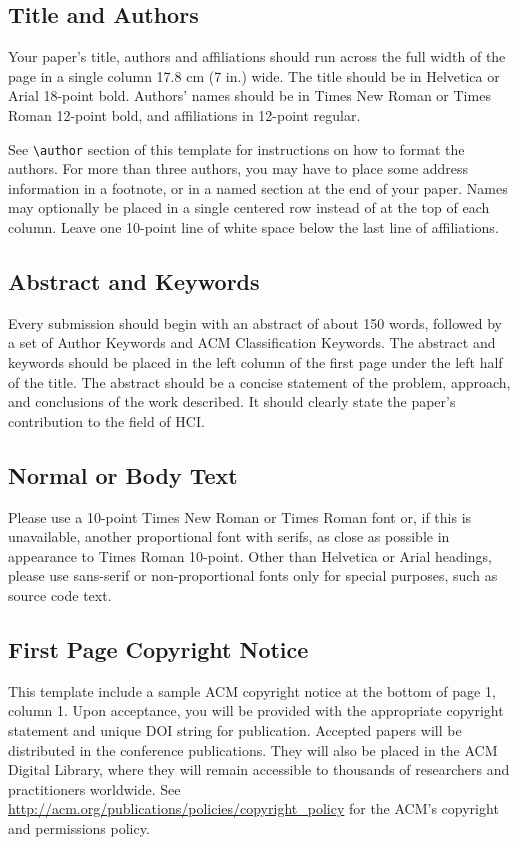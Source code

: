 \documentclass{ciis}
\begin{document}
\subsection{Title and Authors}

Your paper's title, authors and affiliations should run across the
full width of the page in a single column 17.8 cm (7 in.) wide.  The
title should be in Helvetica or Arial 18-point bold.  Authors' names
should be in Times New Roman or Times Roman 12-point bold, and
affiliations in 12-point regular.  

See \texttt{{\textbackslash}author} section of this template for
instructions on how to format the authors. For more than three
authors, you may have to place some address information in a footnote,
or in a named section at the end of your paper. Names may optionally
be placed in a single centered row instead of at the top of each
column. Leave one 10-point line of white space below the last line of
affiliations.

\subsection{Abstract and Keywords}

Every submission should begin with an abstract of about 150 words,
followed by a set of Author Keywords and ACM Classification
Keywords. The abstract and keywords should be placed in the left
column of the first page under the left half of the title. The
abstract should be a concise statement of the problem, approach, and
conclusions of the work described. It should clearly state the paper's
contribution to the field of HCI\@.

\subsection{Normal or Body Text}

Please use a 10-point Times New Roman or Times Roman font or, if this
is unavailable, another proportional font with serifs, as close as
possible in appearance to Times Roman 10-point. Other than Helvetica
or Arial headings, please use sans-serif or non-proportional fonts
only for special purposes, such as source code text.

\subsection{First Page Copyright Notice}
This template include a sample ACM copyright notice at the bottom of
page 1, column 1.  Upon acceptance, you will be provided with the
appropriate copyright statement and unique DOI string for publication.
Accepted papers will be distributed in the conference
publications. They will also be placed in the ACM Digital Library,
where they will remain accessible to thousands of researchers and
practitioners worldwide. See
\url{http://acm.org/publications/policies/copyright_policy} for the
ACM's copyright and permissions policy.
\end{document}
